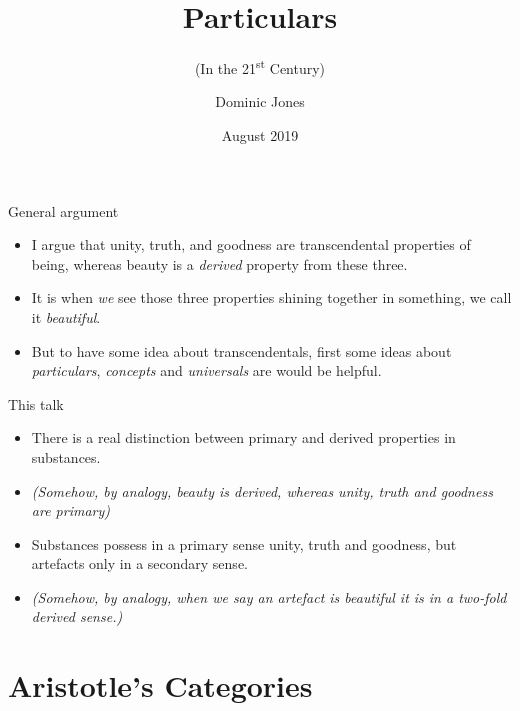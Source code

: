\documentclass[xcolor=dvipsnames]{beamer}
\title{Particulars}
\subtitle{(In the 21\textsuperscript{st} Century)}
\author{Dominic Jones}
\date{\small{August 2019}}
\institute{\small{University of Buckingham}}
\begin{document}
\begin{frame}[plain]
  \titlepage
\end{frame}


\begin{frame}[fragile]{General argument}
  \begin{itemize}
  \item I argue that unity, truth, and goodness are transcendental properties of being, whereas beauty is a \emph{derived} property from these three.\vspace{5mm}
  \item It is when \emph{we} see those three properties shining together in something, we call it \emph{beautiful}.\vspace{5mm}
  \item But to have some idea about transcendentals, first some ideas about \emph{particulars}, \emph{concepts} and \emph{universals} are would be helpful.
  \end{itemize}
\end{frame}


\begin{frame}[fragile]{This talk}
  \begin{itemize}
  \item There is a real distinction between primary and derived properties in substances.\vspace{5mm}
  \item \emph{(Somehow, by analogy, beauty is derived, whereas unity, truth and goodness are primary)}\vspace{5mm}
  \item Substances possess in a primary sense unity, truth and goodness, but artefacts only in a secondary sense.\vspace{5mm}
  \item \emph{(Somehow, by analogy, when we say an artefact is beautiful it is in a two-fold derived sense.)}\vspace{5mm}
  \end{itemize}
\end{frame}


\section{Aristotle's Categories}
\end{document}
